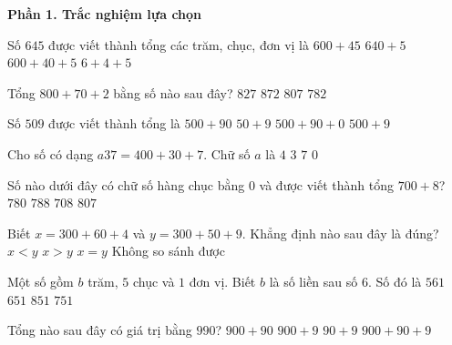 \textbf{Phần 1. Trắc nghiệm lựa chọn}

\begin{ex} %
Số $645$ được viết thành tổng các trăm, chục, đơn vị là
\choice
{$600 + 45$}
{$640 + 5$}
{\True $600 + 40 + 5$}
{$6 + 4 + 5$}
\end{ex}

\begin{ex} %
Tổng $800 + 70 + 2$ bằng số nào sau đây?
\choice
{$827$}
{\True $872$}
{$807$}
{$782$}
\end{ex}

\begin{ex} %
Số $509$ được viết thành tổng là
\choice
{$500 + 90$}
{$50 + 9$}
{$500 + 90 + 0$}
{\True $500 + 9$}
\end{ex}

\begin{ex} %
Cho số có dạng $a37 = 400 + 30 + 7$. Chữ số $a$ là
\choice
{\True $4$}
{$3$}
{$7$}
{$0$}
\end{ex}

\begin{ex} %
Số nào dưới đây có chữ số hàng chục bằng $0$ và được viết thành tổng $700 + 8$?
\choice
{$780$}
{$788$}
{\True $708$}
{$807$}
\end{ex}

\begin{ex} %
Biết $x = 300 + 60 + 4$ và $y = 300 + 50 + 9$. Khẳng định nào sau đây là đúng?
\choice
{$x < y$}
{\True $x > y$}
{$x = y$}
{Không so sánh được}
\end{ex}

\begin{ex} %
Một số gồm $b$ trăm, $5$ chục và $1$ đơn vị. Biết $b$ là số liền sau số $6$. Số đó là
\choice
{$561$}
{$651$}
{$851$}
{\True $751$}
\end{ex}

\begin{ex} %
Tổng nào sau đây có giá trị bằng $990$?
\choice
{\True $900 + 90$}
{$900 + 9$}
{$90 + 9$}
{$900 + 90 + 9$}
\end{ex}


